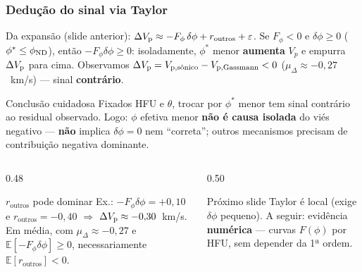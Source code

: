 \documentclass[aspectratio=169,10pt]{beamer}
\begin{document}
\begin{frame}
  \frametitle{Dedução do sinal via Taylor}
  \scriptsize
  Da expansão (slide anterior):
  $\dVp\approx -F_\phi\,\delta\phi + r_{\mathrm{outros}}+\varepsilon$.
  Se $F_\phi<0$ e $\delta\phi\ge 0$ ($\phi^{*}\le\phiND{}$), então
  $-F_\phi\delta\phi\ge 0$:
  isoladamente, $\phi^{*}$ menor \textbf{aumenta} $V_p$ e empurra
  $\dVp$ para cima.
  Observamos $\dVp=\Vpsonsub-V_{\mathrm{p,Gassmann}}<0$
  ($\mu_\Delta\approx -0{,}27$~km/s) --- sinal \textbf{contrário}.
  \vspace{0.06cm}

  \begin{exampleblock}{Conclusão cuidadosa}
    \scriptsize
    Fixados HFU e $\theta$, trocar \phiND{} por $\phi^{*}$ menor
    tem sinal contrário ao residual observado.
    Logo: $\phi$ efetiva menor \textbf{não é causa isolada}
    do viés negativo ---
    \textbf{não} implica $\delta\phi=0$ nem \phiND{} ``correta'';
    outros mecanismos precisam de contribuição negativa dominante.
  \end{exampleblock}
  \vspace{0.05cm}

  \begin{columns}[T,onlytextwidth]
    \begin{column}{0.48\textwidth}
      \begin{block}{$r_{\mathrm{outros}}$ pode dominar}
        \scriptsize
        Ex.: $-F_\phi\delta\phi=+0{,}10$ e
        $r_{\mathrm{outros}}=-0{,}40$
        $\Rightarrow$ $\dVp\approx -0{,}30$~km/s.
        Em média, com $\mu_\Delta\approx -0{,}27$ e
        $\mathbb{E}[-F_\phi\delta\phi]\ge 0$,
        necessariamente $\mathbb{E}[r_{\mathrm{outros}}]<0$.
      \end{block}
    \end{column}
    \begin{column}{0.50\textwidth}
      \begin{block}{Próximo slide}
        \scriptsize
        Taylor é local (exige $\delta\phi$ pequeno).
        A seguir: evidência \textbf{numérica} ---
        curvas $F(\phi)$ por HFU, sem depender da 1ª ordem.
      \end{block}
    \end{column}
  \end{columns}
\end{frame}
\end{document}
